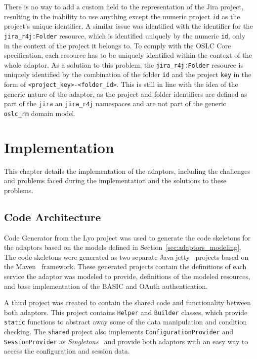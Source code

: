 There is no way to add a custom field to the representation of the Jira project, resulting in the inability to use anything except the numeric project \texttt{id} as the project's unique identifier. A similar issue was identified with the identifier for the \texttt{jira\_r4j:Folder} resource, which is identified uniquely by the numeric \texttt{id}, only in the context of the project it belongs to. To comply with the OSLC Core specification, each resource has to be uniquely identified within the context of the whole adaptor. As a solution to this problem, the \texttt{jira\_r4j:Folder} resource is uniquely identified by the combination of the folder \texttt{id} and the project \texttt{key} in the form of \texttt{<project\_key>-<folder\_id>}. This is still in line with the idea of the generic nature of the adaptor, as the project and folder identifiers are defined as part of the \texttt{jira} an \texttt{jira\_r4j} namespaces and are not part of the generic \texttt{oslc\_rm} domain model.


\chapter{Implementation}
\label{chapter:implementation}
This chapter details the implementation of the adaptors, including the challenges and problems faced during the implementation and the solutions to these problems.

\section{Code Architecture}
Code Generator from the Lyo project was used to generate the code skeletons for the adaptors based on the models defined in Section \ref{sec:adaptors_modeling}. The code skeletons were generated as two separate Java jetty \cite{jetty} projects based on the Maven \cite{maven} framework. These generated projects contain the definitions of each service the adaptor was modeled to provide, definitions of the modeled resources, and base implementation of the BASIC and OAuth authentication.

A third project was created to contain the shared code and functionality between both adaptors. This project contains \texttt{Helper} and \texttt{Builder} classes, which provide \texttt{static} functions to abstract away some of the data manipulation and condition checking. The \texttt{shared} project also implements \texttt{ConfigurationProvider} and \texttt{SessionProvider} as \emph{Singletons} \cite{singleton_design_pattern} and provide both adaptors with an easy way to access the configuration and session data.

